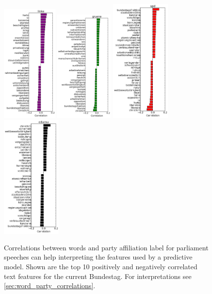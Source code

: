 \documentclass{article}
\begin{document}
\begin{figure}
\begin{center}
\includegraphics[width=2.8cm]{images/party_word_correlations-linke-17.pdf}
\includegraphics[width=2.9cm]{images/party_word_correlations-gruene-17.pdf}
\includegraphics[width=3cm]{images/party_word_correlations-spd-17.pdf}
\includegraphics[width=3cm]{images/party_word_correlations-cducsu-17.pdf}
%
\end{center}
\caption{
\label{fig:party_word_correlations}
Correlations between words and party affiliation label for parliament speeches can help interpreting the features used by a predictive model. Shown are the top 10 positively and negatively correlated text features for the current Bundestag. For interpretations see \autoref{sec:word_party_correlations}.}
\end{figure}
\end{document}
